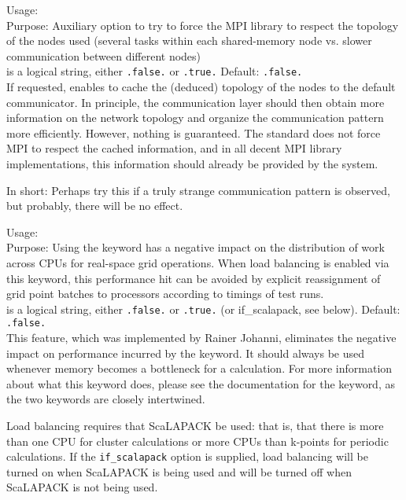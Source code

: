 {
  \noindent
  Usage:   \\[1.0ex]
  Purpose: Auxiliary option to try to force the MPI library to respect
    the topology of the nodes used (several tasks within each
    shared-memory node vs. slower communication between different
    nodes) \\[1.0ex]
   is a logical string, either \texttt{.false.} or
    \texttt{.true.} Default: \texttt{.false.} \\
}
If requested, enables to cache the (deduced) topology of the nodes to
the default communicator. In principle, the communication layer should
then obtain more information on the network topology and organize the
communication pattern more efficiently. However, nothing is
guaranteed. The standard does not force MPI to respect the cached
information, and in all decent MPI library implementations, this
information should already be provided by the system. 

In short: Perhaps try this if a truly strange communication pattern is
observed, but probably, there will be no effect. 


{
  \noindent
  Usage:   \\[1.0ex]
  Purpose: Using the keyword  has a negative impact
  on the distribution of work across CPUs for real-space grid operations.  When
  load balancing is enabled via this keyword, this performance hit can be
  avoided by explicit reassignment of grid point batches to processors according
  to timings of test runs.
  \\[1.0ex]
   is a logical string, either \texttt{.false.} or
  \texttt{.true.} (or if\_scalapack, see below). Default: \texttt{.false.} \\
}
%
This feature, which was implemented by Rainer Johanni, eliminates the negative
impact on performance incurred by the  keyword.  It
should always be used whenever memory becomes a bottleneck for a calculation.
For more information about what this keyword does, please see the documentation
for the  keyword, as the two keywords are closely
intertwined.

Load balancing requires that ScaLAPACK be used: that is, that there is more
than one CPU for cluster calculations or more CPUs than k-points for periodic
calculations.  If the \texttt{if\_scalapack} option is supplied, load balancing
will be turned on when ScaLAPACK is being used and will be turned off when
ScaLAPACK is not being used.

